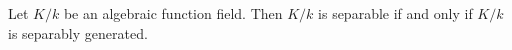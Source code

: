 Let $K/k$ be an algebraic function field. Then $K/k$ is separable if and only if $K/k$ is separably generated.
